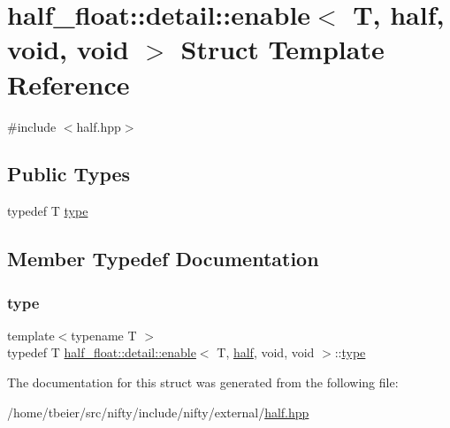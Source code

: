 \hypertarget{structhalf__float_1_1detail_1_1enable_3_01T_00_01half_00_01void_00_01void_01_4}{}\section{half\+\_\+float\+:\+:detail\+:\+:enable$<$ T, half, void, void $>$ Struct Template Reference}
\label{structhalf__float_1_1detail_1_1enable_3_01T_00_01half_00_01void_00_01void_01_4}


{\ttfamily \#include $<$half.\+hpp$>$}

\subsection*{Public Types}
\begin{DoxyCompactItemize}
\item 
typedef T \hyperlink{structhalf__float_1_1detail_1_1enable_3_01T_00_01half_00_01void_00_01void_01_4_a3622a516453af349d6f6c29f393e7922}{type}
\end{DoxyCompactItemize}


\subsection{Member Typedef Documentation}
\mbox{\label{structhalf__float_1_1detail_1_1enable_3_01T_00_01half_00_01void_00_01void_01_4_a3622a516453af349d6f6c29f393e7922}} 
\subsubsection{\texorpdfstring{type}{type}}
{\footnotesize\ttfamily template$<$typename T $>$ \\
typedef T \hyperlink{structhalf__float_1_1detail_1_1enable}{half\+\_\+float\+::detail\+::enable}$<$ T, \hyperlink{classhalf__float_1_1half}{half}, void, void $>$\+::\hyperlink{structhalf__float_1_1detail_1_1enable_3_01T_00_01half_00_01void_00_01void_01_4_a3622a516453af349d6f6c29f393e7922}{type}}



The documentation for this struct was generated from the following file\+:\begin{DoxyCompactItemize}
\item 
/home/tbeier/src/nifty/include/nifty/external/\hyperlink{half_8hpp}{half.\+hpp}\end{DoxyCompactItemize}
